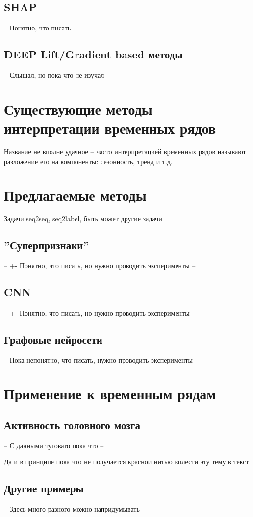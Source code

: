 \documentclass[12pt]{article}
\begin{document}
\subsection{SHAP}
-- Понятно, что писать --
\subsection{DEEP Lift/Gradient based методы}
-- Слышал, но пока что не изучал --

\section{Существующие методы интерпретации временных рядов}
Название не вполне удачное -- часто интерпретацией временных рядов называют
разложение его на компоненты: сезонность, тренд и т.д.

\section{Предлагаемые методы}
Задачи seq2seq, seq2label, быть может другие задачи 
\subsection{''Суперпризнаки''}
-- +- Понятно, что писать, но нужно проводить эксперименты --
\subsection{CNN}
-- +- Понятно, что писать, но нужно проводить эксперименты --
\subsection{Графовые нейросети}
--  Пока непонятно, что писать, нужно проводить эксперименты --

\section{Применение к временным рядам}
\subsection{Активность головного мозга}
-- С данными туговато пока что --

Да и в принципе пока что не получается красной нитью вплести
эту тему в текст
\subsection{Другие примеры}
-- Здесь много разного можно напридумывать --
\end{document}
